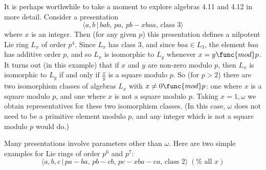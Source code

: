 \documentclass[10pt]{article}
\begin{document}
It is perhaps worthwhile to take a moment to explore algebras 4.11 and 4.12
in more detail. Consider a presentation%
\[
\langle a,b\,|\,bab,\,pa,\,pb-xbaa,\,\text{class }3\rangle 
\]%
where $x$ is an integer. Then (for any given $p$) this presentation defines
a nilpotent Lie ring $L_{x}$ of order $p^{4}$. Since $L_{x}$ has class 3,
and since $baa\in L_{3}$, the element $baa$ has additive order $p$, and so $%
L_{x}$ is isomorphic to $L_{y}$ whenever $x=y\func{mod}p$. It turns out (in
this example) that if $x$ and $y$ are non-zero modulo $p$, then $L_{x}$ is
isomorphic to $L_{y}$ if and only if $\frac{x}{y}$ is a square modulo $p$.
So (for $p>2$) there are two isomorphism classes of algebras $L_{x}$ with $%
x\neq 0\func{mod}p$: one where $x$ is a square modulo $p$, and one where $x$
is not a square modulo $p$. Taking $x=1,\omega $ we obtain representatives
for these two isomorphism classes. (In this case, $\omega $ does not need to
be a primitive element modulo $p$, and any integer which is not a square
modulo $p$ would do.)

Many presentations involve parameters other than $\omega $. Here are two
simple examples for Lie rings of order $p^{6}$ and $p^{7}$:%
\begin{equation}
\langle a,b,c\,|\,pa-ba,\,pb-cb,\,pc-xba-ca,\,\text{class }2\rangle \;(\text{%
all }x)  \tag{6.114}
\end{equation}
\end{document}
